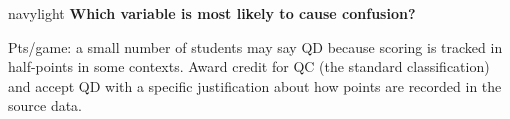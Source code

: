 \documentclass[10pt]{article}
\begin{document}
\begin{blurbbox}{navylight}
\vspace{8pt}
\textbf{Which variable is most likely to cause confusion?}\\[4pt]

\end{blurbbox}

\begin{teachernote}
Pts/game: a small number of students may say QD because scoring is tracked in
half-points in some contexts. Award credit for QC (the standard classification) and
accept QD with a specific justification about how points are recorded in the source data.
\end{teachernote}

\vspace{0.14in}
\end{document}
